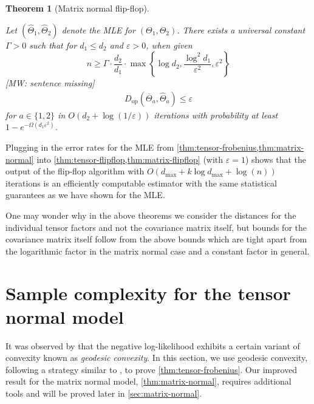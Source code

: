 \documentclass[aos]{imsart}
\newtheorem{theorem}{Theorem}[section]
\theoremstyle{definition}
\numberwithin{equation}{section}
\newcommand{\eps}{\varepsilon}
\newcommand{\Dop}{D_{\operatorname{op}}}
\def\dmax{d_{\max}}
\newcommand{\CF}[1]{{\color{purple}[CF: #1]}}
\newcommand{\RMO}[1]{{\color{olive}[RMO: #1]}}
\newcommand{\MW}[1]{{\color{red}[MW: #1]}}
\newcommand{\CF}[1]{{}}
\newcommand{\RMO}[1]{{}}
\newcommand{\MW}[1]{{}}
\begin{document}
\newcommand{\MatrixFlop}{
Let $(\widehat{\Theta}_1,\widehat{\Theta}_2)$ denote the MLE for $(\Theta_1,\Theta_2)$. There exists a universal constant $\Gamma > 0$ such that for $d_1 \leq d_2$ and $\eps > 0$, when given
$$n \geq \Gamma \cdot \dfrac{d_2}{d_1} \cdot \max\left\{ \log d_2, \dfrac{\log^2 d_1}{\eps^2}, \eps^2 \right\}$$
\MW{sentence missing}
\begin{align*}
  \Dop(\overline{\Theta}_a, \widehat{\Theta}_a) \leq \eps
\end{align*}
for $a\in\{1,2\}$ in $O\left(d_2 +  \log(1/\eps) \right)$ iterations with probability at least $1 - e^{- \Omega(d_1 \eps^2)}$.
}

\begin{theorem}[Matrix normal flip-flop]\label{thm:matrix-flipflop}
\MatrixFlop\end{theorem}

Plugging in the error rates for the MLE from \cref{thm:tensor-frobenius,thm:matrix-normal} into \cref{thm:tensor-flipflop,thm:matrix-flipflop} (with $\eps = 1$) shows that the output of the flip-flop algorithm with $O\left(\dmax + k \log \dmax + \log(n)\right)$ iterations is an efficiently computable estimator with the same statistical guarantees as we have shown for the MLE.

One may wonder why in the above theorems we consider the distances for the individual tensor factors and not the covariance matrix itself, but bounds for the covariance matrix itself follow from the above bounds which are tight apart from the logarithmic factor in the matrix normal case and a constant factor in general.

\section{Sample complexity for the tensor normal model}\label{sec:tensor-normal}
It was observed by \cite{wiesel2012geodesic} that the negative log-likelihood exhibits a certain variant of convexity known as \emph{geodesic convexity}.
In this section, we use geodesic convexity, following a strategy similar to \cite{FM20}, to prove \cref{thm:tensor-frobenius}.
Our improved result for the matrix normal model, \cref{thm:matrix-normal}, requires additional tools and will
be proved later in \cref{sec:matrix-normal}.
\end{document}

